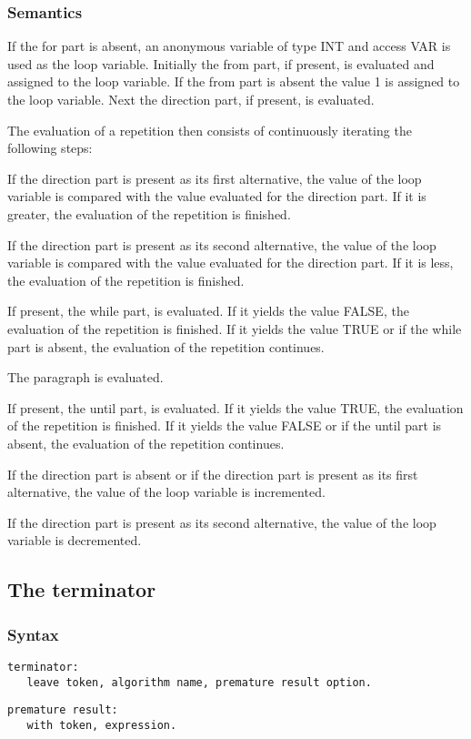 \documentclass [a4paper,12pt,fleqn]{article}
\begin{document}
\subsubsection*{Semantics}
If the for part is absent, an anonymous variable of type INT and access VAR
is used as the loop variable. Initially the from part, if present, is
evaluated and assigned to the loop variable. If the from part is absent
the value 1 is assigned to the loop variable. Next the direction part,
if present, is evaluated.

The evaluation of a repetition then consists of continuously iterating the
following steps:
\begin{list}{-}{}
\item
If the direction part is present as its first alternative, the value of the
loop variable is compared with the value evaluated for the direction part.
If it is greater, the evaluation of the repetition is finished.

If the direction part is present as its second alternative, the value of the
loop variable is compared with the value evaluated for the direction part.
If it is less, the evaluation of the repetition is finished.
\item
If present, the while part, is evaluated. If it yields the value FALSE,
the evaluation of the repetition is finished. If it yields the value TRUE or
if the while part is absent, the evaluation of the repetition continues.
\item
The paragraph is evaluated.
\item
If present, the until part, is evaluated. If it yields the value TRUE,
the evaluation of the repetition is finished. If it yields the value FALSE or
if the until part is absent, the evaluation of the repetition continues.
\item
If the direction part is absent or if the direction part is present as its
first alternative, the value of the loop variable is incremented.

If the direction part is present as its second alternative, the value of the
loop variable is decremented.
\end{list}
\subsection {The terminator}
\subsubsection*{Syntax}
\begin{letterlist}
\item
\begin{verbatim}
terminator:
   leave token, algorithm name, premature result option.
\end{verbatim}
\item
\begin{verbatim}
premature result:
   with token, expression.
\end{verbatim}
\end{letterlist}
\end{document}
